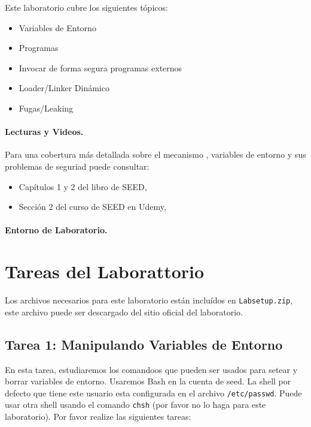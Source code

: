 Este laboratorio cubre los siguientes tópicos:

\begin{itemize}[noitemsep]
\item Variables de Entorno
\item Programas \setuid
\item Invocar de forma segura programas externos
\item Loader/Linker Dinámico
\item Fugas/Leaking
\end{itemize}


\paragraph{Lecturas y Videos.}
Para una cobertura más detallada sobre el mecanismo \setuid, variables de entorno y sus problemas de seguriad puede consultar:

\begin{itemize}
\item Capítulos 1 y 2 del libro de SEED, \seedbook
\item Sección 2 del curso de SEED en Udemy, \seedcsvideo
\end{itemize}

\paragraph{Entorno de Laboratorio.} \seedenvironmentC





\section{Tareas del Laborattorio}

Los archivos necesarios para este laboratorio están incluídos en \texttt{Labsetup.zip}, este archivo puede ser descargado del sitio oficial del laboratorio.


\subsection{Tarea 1: Manipulando Variables de Entorno}

En esta tarea, estudiaremos los comandoos que pueden ser usados para setear y borrar variables de entorno. Usaremos Bash en la cuenta de seed. La shell por defecto que tiene este usuario esta configurada en el archivo {\tt /etc/passwd}. Puede usar otra shell usando el comando {\tt chsh} (por favor no lo haga para este laboratorio). Por favor realize las siguientes tareas:

